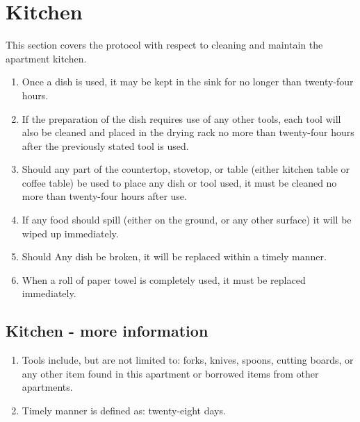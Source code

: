 \documentclass[10pt]{article}
\begin{document}
\section{Kitchen}
This section covers the protocol with respect to cleaning and maintain the apartment kitchen.
\begin{enumerate}
	\item Once a dish is used, it may be kept in the sink for no longer than twenty-four hours.
	\item If the preparation of the dish requires use of any other tools, each tool will also be cleaned and placed in the drying rack no more than twenty-four hours after the previously stated tool is used. 
	\item Should any part of the countertop, stovetop, or table (either kitchen table or coffee table) be used to place any dish or tool used, it must be cleaned no more than twenty-four hours after use.
	\item If any food should spill (either on the ground, or any other surface) it will be wiped up immediately.
	\item Should Any dish be broken, it will be replaced within a timely manner.
	\item When a roll of paper towel is completely used, it must be replaced immediately.
	
\end{enumerate}
\subsection{Kitchen - more information}
\begin{enumerate}
	\item Tools include, but are not limited to: forks, knives, spoons, cutting boards, or any other item found in this apartment or borrowed items from other apartments.
	\item Timely manner is defined as: twenty-eight days.
	
\end{enumerate}
\end{document}
